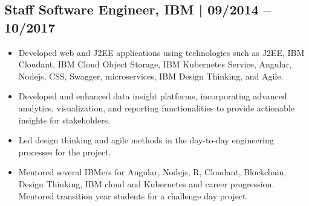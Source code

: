 \documentclass[12pt,parskip=half]{scrartcl}
\begin{document}
\subsection*{Staff Software Engineer, IBM | 09/2014 -- 10/2017}
\begin{itemize}
\item Developed web and J2EE applications using technologies such as J2EE, IBM Cloudant, IBM Cloud Object Storage, IBM Kubernetes Service, Angular, Nodejs, CSS, Swagger, microservices, IBM Design Thinking, and Agile.
 \item Developed and enhanced data insight platforms, incorporating advanced analytics, visualization, and reporting functionalities to provide actionable insights for stakeholders.
 \item Led design thinking and agile methods in the day-to-day engineering processes for the project. 
\item Mentored several IBMers for Angular, Nodejs, R, Cloudant, Blockchain, Design Thinking, IBM cloud and Kubernetes and career progression. Mentored transition year students for a challenge day project. 
    
\end{itemize}
\end{document}
